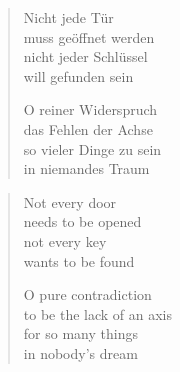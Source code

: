 
\cleartoverso


\begin{verse}

Nicht jede Tür\\
muss geöffnet werden\\
nicht jeder Schlüssel\\
will gefunden sein

O reiner Widerspruch\\
das Fehlen der Achse\\
so vieler Dinge zu sein\\
in niemandes Traum

\end{verse}

\clearpage


\begin{verse}

Not every door\\
needs to be opened\\
not every key\\
wants to be found

O pure contradiction\\
to be the lack of an axis\\
for so many things\\
in nobody's dream

\end{verse}
